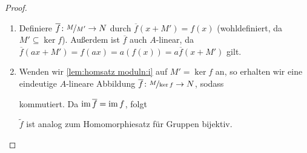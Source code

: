 \documentclass[12pt,a4paper]{scrartcl}
\theoremstyle{cplain}
\theoremstyle{cdef}
\begin{document}
\begin{proof}
	\leavevmode
	\begin{enumerate}[label=\ref{lem:homsatz moduln:\roman*}]
		\item Definiere $\overline{f}\colon \nicefrac{M}{M'}\to N$ durch $\overline{f}(x+M') = f(x)$ (wohldefiniert, da $M'\subseteq \ker f$). Außerdem ist $\overline{f}$ auch $A$-linear, da $\overline{f}(ax+M') = f(ax) = a(f(x)) = a\overline{f}(x+M')$ gilt.
        \item Wenden wir \ref{lem:homsatz moduln:i} auf $M' = \ker f$ an, so erhalten wir eine eindeutige $A$-lineare Abbildung $\overline{f}\colon \nicefrac{M}{\operatorname{ker} f}\to N$, sodass
        \begin{center}
        \end{center}
        
        kommutiert. Da $\operatorname{im}\overline{f} = \operatorname{im} f$, folgt
        \begin{center}
        \end{center}
		
        $\tilde{f}$ ist analog zum Homomorphiesatz für Gruppen bijektiv.
        \qedhere
	\end{enumerate}
\end{proof}
\end{document}
